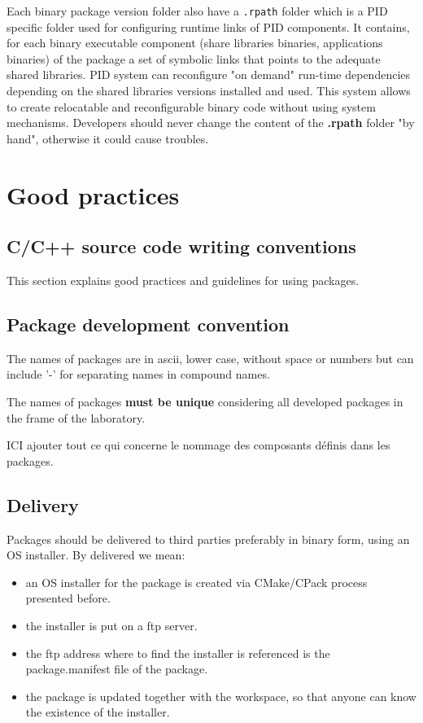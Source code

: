 \documentclass[12pt,a4paper]{article}
\begin{document}
Each binary package version folder also have a \texttt{.rpath} folder which is a PID specific folder used for configuring runtime links of PID components. It contains, for each binary executable component (share libraries binaries, applications binaries) of the package a set of symbolic links that points to the adequate shared libraries. PID system can reconfigure "on demand" run-time dependencies depending on the shared libraries versions installed and used. This system allows to create relocatable and reconfigurable binary code without using system mechanisms. Developers should never change the content of the \textbf{.rpath} folder "by hand", otherwise it could cause troubles.

\pagebreak

\section{Good practices}

\subsection{C/C++ source code writing conventions}

This section explains good practices and guidelines for using packages.

\subsection{Package development convention}

The names of packages are in ascii, lower case, without space or numbers but can include '-' for separating names in compound names.

The names of packages \textbf{must be unique} considering all developed packages in the frame of the laboratory.

ICI ajouter tout ce qui concerne le nommage des composants définis dans les packages.

\subsection{Delivery}

Packages should be delivered to third parties preferably in binary form, using an OS installer. By delivered we mean:
\begin{itemize}
\item an OS installer for the package is created via CMake/CPack process presented before.
\item the installer is put on a ftp server.
\item the ftp address where to find the installer is referenced is the package.manifest file of the package.
\item the package is updated together with the workspace, so that anyone can know the existence of the installer.
\end{itemize}
\end{document}
